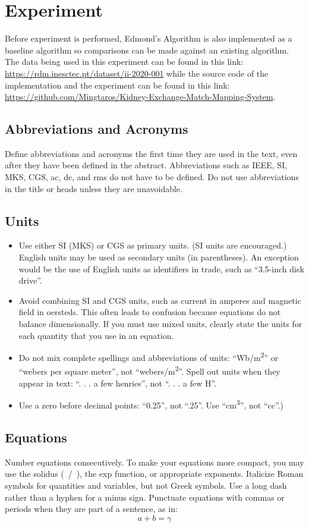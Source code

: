 \documentclass[conference]{IEEEtran}
\begin{document}
\section{Experiment}
Before experiment is performed, Edmond's Algorithm is also implemented as a baseline algorithm so comparisons can be made against
an existing algorithm. The data being used in this experiment can be found in this link: \url{https://rdm.inesctec.pt/dataset/ii-2020-001}
while the source code of the implementation and the experiment can be found in this link: \url{https://github.com/Mingtaros/Kidney-Exchange-Match-Mapping-System}.

\subsection{Abbreviations and Acronyms}\label{AA}
Define abbreviations and acronyms the first time they are used in the text, 
even after they have been defined in the abstract. Abbreviations such as 
IEEE, SI, MKS, CGS, ac, dc, and rms do not have to be defined. Do not use 
abbreviations in the title or heads unless they are unavoidable.

\subsection{Units}
\begin{itemize}
\item Use either SI (MKS) or CGS as primary units. (SI units are encouraged.) English units may be used as secondary units (in parentheses). An exception would be the use of English units as identifiers in trade, such as ``3.5-inch disk drive''.
\item Avoid combining SI and CGS units, such as current in amperes and magnetic field in oersteds. This often leads to confusion because equations do not balance dimensionally. If you must use mixed units, clearly state the units for each quantity that you use in an equation.
\item Do not mix complete spellings and abbreviations of units: ``Wb/m\textsuperscript{2}'' or ``webers per square meter'', not ``webers/m\textsuperscript{2}''. Spell out units when they appear in text: ``. . . a few henries'', not ``. . . a few H''.
\item Use a zero before decimal points: ``0.25'', not ``.25''. Use ``cm\textsuperscript{3}'', not ``cc''.)
\end{itemize}

\subsection{Equations}
Number equations consecutively. To make your 
equations more compact, you may use the solidus (~/~), the exp function, or 
appropriate exponents. Italicize Roman symbols for quantities and variables, 
but not Greek symbols. Use a long dash rather than a hyphen for a minus 
sign. Punctuate equations with commas or periods when they are part of a 
sentence, as in:
\begin{equation}
a+b=\gamma\label{eq}
\end{equation}
\end{document}
